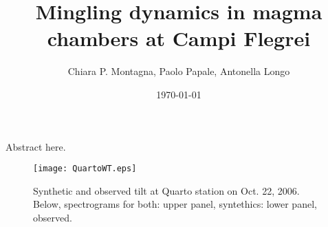 \documentclass[fleqn,11pt]{article}
\begin{document}
\title{\huge\bf Mingling dynamics in magma chambers at Campi Flegrei}
\author{Chiara P. Montagna, Paolo Papale, Antonella Longo}
\date{\today}
\maketitle

Abstract here.

\begin{figure}[h]
  \centering
  \texttt{[image: QuartoWT.eps]} %
  \caption{Synthetic and observed tilt at Quarto station on Oct. 22,
    2006. Below, spectrograms for both: upper panel, syntethics: lower
    panel, observed.}
\label{}
\end{figure}
\end{document}
